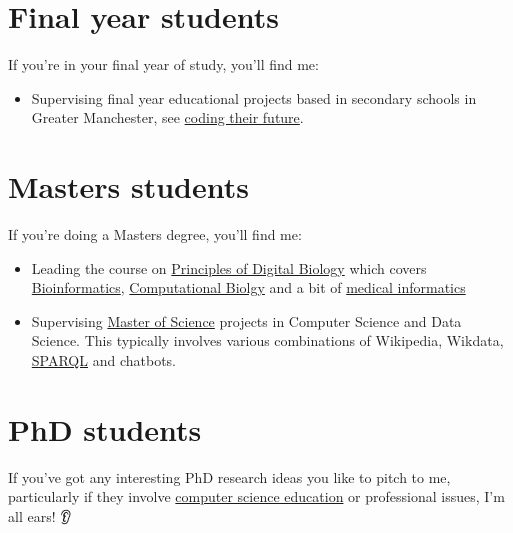 \documentclass[
  12pt,
]{book}
\providecommand{\tightlist}{%
  \setlength{\itemsep}{0pt}\setlength{\parskip}{0pt}}
\begin{document}
\hypertarget{finalyear}{%
\section{Final year students}\label{finalyear}}

If you're in your final year of study, you'll find me:

\begin{itemize}
\tightlist
\item
  Supervising final year educational projects based in secondary schools in Greater Manchester, see \href{https://personalpages.manchester.ac.uk/staff/duncan.hull/coding-their-future.html}{coding their future}. \citep{computinged} 👩‍💻👨‍💻
\end{itemize}

\hypertarget{masters}{%
\section{Masters students}\label{masters}}

If you're doing a Masters degree, you'll find me:

\begin{itemize}
\tightlist
\item
  Leading the course on \href{http://studentnet.cs.manchester.ac.uk/pgt/COMP60532/syllabus/}{Principles of Digital Biology} which covers \href{https://en.wikipedia.org/wiki/Bioinformatics}{Bioinformatics}, \href{https://en.wikipedia.org/wiki/Computational_biology}{Computational Biolgy} and a bit of \href{https://en.wikipedia.org/wiki/Health_informatics}{medical informatics} 🧬
\item
  Supervising \href{https://www.cs.manchester.ac.uk/study/masters/}{Master of Science} projects in Computer Science and Data Science. \citep{r4ds} This typically involves various combinations of Wikipedia, Wikdata, \href{https://en.wikipedia.org/wiki/SPARQL}{SPARQL} \citep{ducharme} and chatbots. 🤖 \citep{myca}
\end{itemize}

\hypertarget{phds}{%
\section{PhD students}\label{phds}}

If you've got any interesting PhD research ideas you like to pitch to me, particularly if they involve \href{https://sigcse.cs.manchester.ac.uk}{computer science education} or professional issues, I'm all ears! 👂
\end{document}
